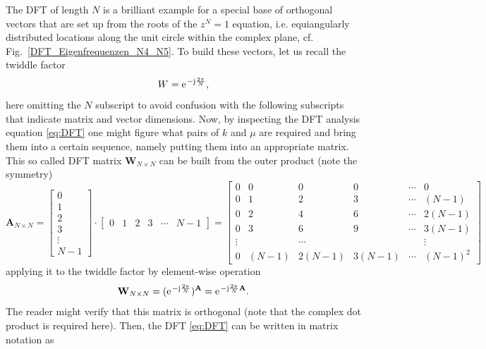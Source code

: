 \documentclass[11pt,a4paper,DIV=12]{scrartcl}
\begin{document}
The DFT of length $N$ is a brilliant example for a special base of orthogonal
vectors that are set up from the roots of the $z^N=1$ equation, i.e.
equiangularly distributed locations along the unit circle within the complex
plane, cf. Fig.~\ref{DFT_Eigenfrequenzen_N4_N5}.
%
To build these vectors, let us recall the twiddle factor
\begin{equation}
W=\e^{-\im\frac{2\pi}{N}},
\end{equation}
here omitting the $N$ subscript to avoid confusion with the following subscripts
that indicate matrix and vector dimensions.
%
Now, by inspecting the DFT analysis equation \eqref{eq:DFT} one might figure
what pairs of $k$ and $\mu$ are required and bring them into a certain sequence,
namely putting them into an appropriate matrix.
%
This so called DFT matrix $\mathbf{W}_{N \times N}$ can be built from the
outer product (note the symmetry)
\begin{equation*}
\mathbf{A}_{N \times N} =
\begin{bmatrix}
0\\
1\\
2\\
3\\
\vdots\\
N-1
\end{bmatrix}
\cdot
\begin{bmatrix}
0 & 1 & 2 & 3 &\cdots & N-1
\end{bmatrix}
=
\begin{bmatrix}
0 & 0 & 0 & 0 & \cdots & 0\\
0 & 1 & 2 & 3 & \cdots & (N-1)\\
0 & 2 & 4 & 6 & \cdots & 2(N-1)\\
0 & 3 & 6 & 9 & \cdots & 3(N-1)\\
\vdots & & \cdots& & & \vdots\\
0 & (N-1) & 2(N-1) & 3(N-1) & \cdots & (N-1)^2
\end{bmatrix}
\end{equation*}
%
applying it to the twiddle factor by element-wise operation
%
\begin{equation}
\mathbf{W}_{N \times N} =
(\e^{-\im\frac{2\pi}{N}})^\mathbf{A} =
\e^{-\im\frac{2\pi}{N} \mathbf{A}}.
\end{equation}
%
The reader might verify that this matrix is orthogonal
(note that the complex dot product is required here).
%
Then, the DFT \eqref{eq:DFT} can be written in matrix notation as
\end{document}
